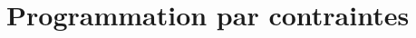 

\cleardoublepage
\begin{minipage}{0.95\linewidth}
\part{Programmation par contraintes}
\label{part:PPC}
\vspace{15mm} %
\parttoc 
\end{minipage}


